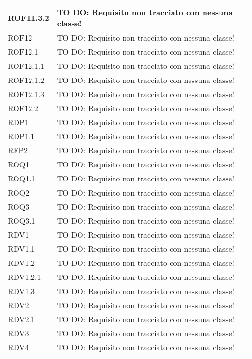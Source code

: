 \begin{center}
\begin{longtable}{| p{2.5cm} | p{11cm} |}
\hline
ROF11.3.2 & TO DO: Requisito non tracciato con nessuna classe! \\
\hline
ROF12 & TO DO: Requisito non tracciato con nessuna classe! \\
\hline
ROF12.1 & TO DO: Requisito non tracciato con nessuna classe! \\
\hline
ROF12.1.1 & TO DO: Requisito non tracciato con nessuna classe! \\
\hline
ROF12.1.2 & TO DO: Requisito non tracciato con nessuna classe! \\
\hline
ROF12.1.3 & TO DO: Requisito non tracciato con nessuna classe! \\
\hline
ROF12.2 & TO DO: Requisito non tracciato con nessuna classe! \\
\hline
RDP1 & TO DO: Requisito non tracciato con nessuna classe! \\
\hline
RDP1.1 & TO DO: Requisito non tracciato con nessuna classe! \\
\hline
RFP2 & TO DO: Requisito non tracciato con nessuna classe! \\
\hline
ROQ1 & TO DO: Requisito non tracciato con nessuna classe! \\
\hline
ROQ1.1 & TO DO: Requisito non tracciato con nessuna classe! \\
\hline
ROQ2 & TO DO: Requisito non tracciato con nessuna classe! \\
\hline
ROQ3 & TO DO: Requisito non tracciato con nessuna classe! \\
\hline
ROQ3.1 & TO DO: Requisito non tracciato con nessuna classe! \\
\hline
RDV1 & TO DO: Requisito non tracciato con nessuna classe! \\
\hline
RDV1.1 & TO DO: Requisito non tracciato con nessuna classe! \\
\hline
RDV1.2 & TO DO: Requisito non tracciato con nessuna classe! \\
\hline
RDV1.2.1 & TO DO: Requisito non tracciato con nessuna classe! \\
\hline
RDV1.3 & TO DO: Requisito non tracciato con nessuna classe! \\
\hline
RDV2 & TO DO: Requisito non tracciato con nessuna classe! \\
\hline
RDV2.1 & TO DO: Requisito non tracciato con nessuna classe! \\
\hline
RDV3 & TO DO: Requisito non tracciato con nessuna classe! \\
\hline
RDV4 & TO DO: Requisito non tracciato con nessuna classe! \\

\end{longtable}
\end{center}
